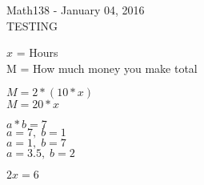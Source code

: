 \documentclass{letter}
\newcommand{\0}[1]{\begin{bmatrix}#1\end{bmatrix}}
\begin{document}
	\begin{center}
		\LARGE Math138 - January 04, 2016\\
		\large TESTING
	\end{center}
	\vspace{0.25 in}
	
	$x$ = Hours\\
	M = How much money you make total
	
	$M = 2 * (10 * x)$\\
	$M = 20 * x$
	
	$a*b = 7$\\
	$a= 7,\; b = 1$\\
	$a=1,\; b = 7$\\
	$a = 3.5, \;b = 2$
	
	$2x = 6$
\end{document}
